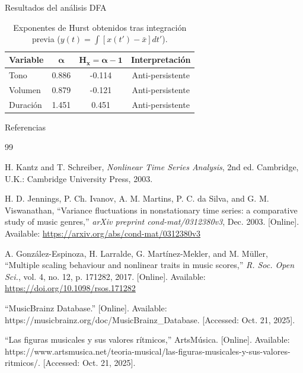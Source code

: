 \documentclass[11pt]{beamer}
\begin{document}
\begin{frame}{Resultados del análisis DFA}
\begin{table}[h!]
\centering
\small
\renewcommand{\arraystretch}{1.3}
\begin{tabular}{lccc}
\hline
\small
\textbf{Variable} & \(\boldsymbol{\alpha}\) & \(\boldsymbol{H_x = \alpha - 1}\) & \textbf{Interpretación} \\ 
\hline
Tono      & 0.886 & -0.114 & Anti-persistente \\ 
Volumen   & 0.879 & -0.121 & Anti-persistente \\ 
Duración  & 1.451 & 0.451  & Anti-persistente \\ 
\hline
\end{tabular}
\caption{Exponentes de Hurst obtenidos tras integración previa (\(y(t) = \int [x(t') - \bar{x}]dt'\)).}
\end{table}
\end{frame}

\begin{frame}{Referencias}
\tiny
\begin{thebibliography}{99}

H. Kantz and T. Schreiber, \textit{Nonlinear Time Series Analysis}, 2nd ed. Cambridge, U.K.: Cambridge University Press, 2003.

H. D. Jennings, P. Ch. Ivanov, A. M. Martins, P. C. da Silva, and G. M. Viswanathan, “Variance fluctuations in nonstationary time series: a comparative study of music genres,” \textit{arXiv preprint cond-mat/0312380v3}, Dec. 2003. [Online]. Available: \url{https://arxiv.org/abs/cond-mat/0312380v3}

A. González-Espinoza, H. Larralde, G. Martínez-Mekler, and M. Müller, “Multiple scaling behaviour and nonlinear traits in music scores,” \textit{R. Soc. Open Sci.}, vol. 4, no. 12, p. 171282, 2017. [Online]. Available: \url{https://doi.org/10.1098/rsos.171282}

“MusicBrainz Database.” [Online]. Available: https://musicbrainz.org/doc/MusicBrainz_Database. [Accessed: Oct. 21, 2025].

“Las figuras musicales y sus valores rítmicos,” ArtsMúsica. [Online]. Available: https://www.artsmusica.net/teoria-musical/las-figuras-musicales-y-sus-valores-ritmicos/. [Accessed: Oct. 21, 2025].


\end{thebibliography}

\end{frame}
\end{document}
